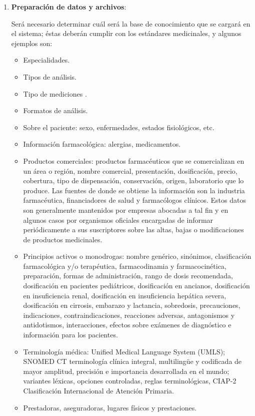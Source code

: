 \begin{enumerate}
\item \textbf{Preparación de datos y archivos}:

Será necesario determinar cuál será la base de conocimiento que se cargará en el sistema; éstas deberán cumplir con los estándares medicinales, y algunos ejemplos son:

\begin{itemize}
    \item Especialidades.
    \item Tipos de  análisis.
    \item Tipo de mediciones .
    \item Formatos de análisis.
    \item Sobre el paciente: sexo, enfermedades, estados fisiológicos, etc.
    \item Información farmacológica: alergias, medicamentos.
    \item Productos comerciales: productos farmacéuticos que se comercializan en un área o región, nombre comercial, presentación, dosificación, precio, cobertura, tipo de dispensación, conservación, origen, laboratorio que lo produce.
    Las fuentes de donde se obtiene la información son la industria farmacéutica, financiadores de salud y farmacólogos clínicos.
    Estos datos son generalmente mantenidos por empresas abocadas a tal fin y en algunos casos por organismos oficiales encargadas de informar periódicamente a sus suscriptores sobre las altas, bajas o modificaciones de productos medicinales.
    \item Principios activos o monodrogas: nombre genérico, sinónimos, clasificación farmacológica y/o terapéutica, farmacodinamia y farmacocinética, preparación, formas de administración, rango de dosis recomendada, dosificación en pacientes pediátricos, dosificación en ancianos, dosificación en insuficiencia renal, dosificación en insuficiencia hepática severa, dosificación en cirrosis, embarazo y lactancia, sobredosis, precauciones, indicaciones, contraindicaciones, reacciones adversas, antagonismos y antidotismos, interacciones, efectos sobre exámenes de diagnóstico e información para los pacientes.
    \item Terminología médica: Unified Medical Language System (UMLS); SNOMED CT terminología clínica integral, multilingüe y codificada de mayor amplitud, precisión e importancia desarrollada en el mundo; variantes léxicas, opciones controladas, reglas terminológicas, CIAP-2 Clasificación Internacional de Atención Primaria.
    \item Prestadoras, aseguradoras, lugares físicos y prestaciones.
\end{itemize}


\end{enumerate}
